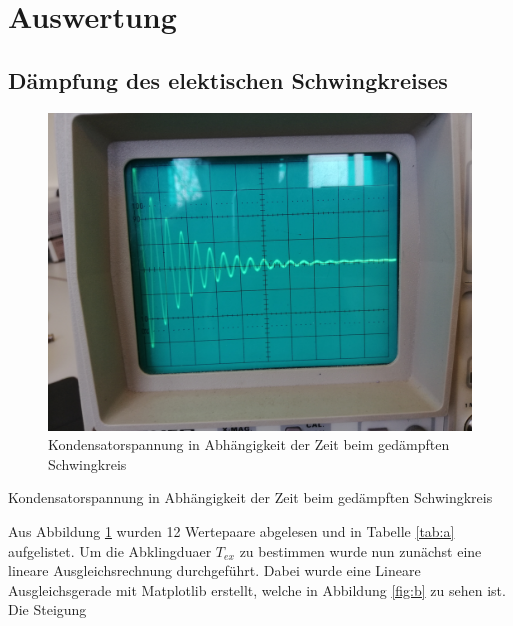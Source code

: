 \section{Auswertung}
\label{sec:Auswertung}
\subsection{Dämpfung des elektischen Schwingkreises}
\label{sec:dae}
\begin{figure}[H]
  \centering
  \includegraphics[width=13cm]{content/Auswertung.jpg}
  \caption{Kondensatorspannung in Abhängigkeit der Zeit beim gedämpften Schwingkreis}
  \label{fig:a1}
\end{figure}

\begin{table}[H]
  \centering
  
  
  \caption{Kondensatorspannung in Abhängigkeit der Zeit beim gedämpften Schwingkreis}
  \label{tab:a}
\end{table}

\noindent Aus Abbildung \ref{fig:a1} wurden 12 Wertepaare
abgelesen und in Tabelle \ref{tab:a} aufgelistet. Um
die Abklingduaer $T_{ex}$ zu bestimmen wurde nun zunächst
eine lineare Ausgleichsrechnung durchgeführt. Dabei
wurde eine Lineare Ausgleichsgerade mit Matplotlib
erstellt, welche in Abbildung \ref{fig:b} zu sehen ist.
Die Steigung

